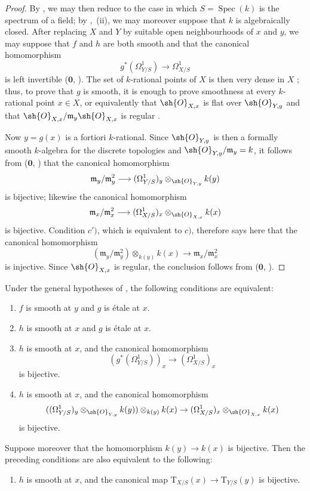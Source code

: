 \begin{proof}
By , we may then reduce to the case in which $S=\operatorname{Spec}(k)$ is the spectrum of a field; by ,~(ii), we may moreover suppose that $k$ is algebraically closed.
After replacing $X$ and $Y$ by suitable open neighbourhoods of $x$ and $y$, we may suppose that $f$ and $h$ are both smooth and that the canonical homomorphism
\[
g^*(\Omega^1_{Y/S}) \to \Omega^1_{X/S}
\]
is left invertible ($\mathbf{0}$, ).
The set of $k$-rational points of $X$ is then very dense in $X$ ; thus, to prove that $g$ is smooth, it is enough to prove smoothness at every $k$-rational point $x\in X$, or equivalently that $\sh{O}_{X,x}$ is flat over $\sh{O}_{Y,y}$ and that $\sh{O}_{X,x}/\mathfrak m_y\sh{O}_{X,x}$ is regular .

Now $y=g(x)$ is a fortiori $k$-rational.
Since $\sh{O}_{Y,y}$ is then a formally smooth $k$-algebra for the discrete topologies and $\sh{O}_{Y,y}/\mathfrak m_y=k$, it follows from ($\mathbf{0}$, ) that the canonical homomorphism
\[
  \mathfrak m_y/\mathfrak m_y^2
  \longrightarrow
  (\Omega^1_{Y/S})_y\otimes_{\sh{O}_{Y,y}}k(y)
\]
is bijective; likewise the canonical homomorphism
\[
  \mathfrak m_x/\mathfrak m_x^2
  \longrightarrow
  (\Omega^1_{X/S})_x\otimes_{\sh{O}_{X,x}}k(x)
\]
is bijective.
Condition $c')$, which is equivalent to $c)$, therefore says here that the canonical homomorphism
\[
  (\mathfrak m_y/\mathfrak m_y^2)\otimes_{k(y)}k(x)
  \longrightarrow \mathfrak m_x/\mathfrak m_x^2
\]
is injective.
Since $\sh{O}_{X,x}$ is regular, the conclusion follows from ($\mathbf{0}$, ).
\end{proof}


\begin{corollary}[17.11.2]
\label{IV.17.11.2}
Under the general hypotheses of , the following conditions are equivalent:
\begin{enumerate}
  \item[a)] $f$ is smooth at $y$ and $g$ is \'etale at $x$.
  \item[b)] $h$ is smooth at $x$ and $g$ is \'etale at $x$.
  \item[c)] $h$ is smooth at $x$, and the canonical homomorphism
\[
(g^*(\Omega^1_{Y/S}))_x \to (\Omega^1_{X/S})_x
\]
is bijective.
  \item[c')] $h$ is smooth at $x$, and the canonical homomorphism
\[
((\Omega^1_{Y/S})_y\otimes_{\sh{O}_{Y,y}} k(y))\otimes_{k(y)} k(x) \to (\Omega^1_{X/S})_x\otimes_{\sh{O}_{X,x}} k(x)
\]
is bijective.
\end{enumerate}
Suppose moreover that the homomorphism $k(y)\to k(x)$ is bijective.
Then the preceding conditions are also equivalent to the following:
\begin{enumerate}
  \item[d)] $h$ is smooth at $x$, and the canonical map $\mathrm{T}_{X/S}(x)\to\mathrm{T}_{Y/S}(y)$  is bijective.
\end{enumerate}
\end{corollary}

